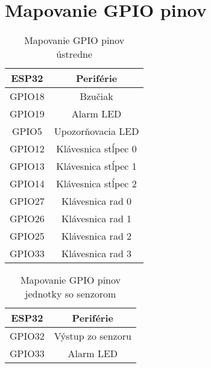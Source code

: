 \chapter{Mapovanie GPIO pinov}

\begin{table}[ht]
    \centering
    \renewcommand{\arraystretch}{1.5}
    \begin{tabular}{|c|c|}
        \hline
        \textbf{ESP32} & \textbf{Periférie} \\ \hline
        GPIO18 &	Bzučiak \\ \hline
        GPIO19 &	Alarm LED \\ \hline
        GPIO5  &	Upozorňovacia LED \\ \hline
        GPIO12 &	Klávesnica stĺpec 0 \\ \hline
        GPIO13 &	Klávesnica stĺpec 1 \\ \hline
        GPIO14 &	Klávesnica stĺpec 2 \\ \hline
        GPIO27 &	Klávesnica rad 0 \\ \hline
        GPIO26 &	Klávesnica rad 1 \\ \hline
        GPIO25 &	Klávesnica rad 2 \\ \hline
        GPIO33 &	Klávesnica rad 3 \\ \hline
    \end{tabular}
    \caption{Mapovanie GPIO pinov ústredne}
    \label{tab:gpio_ustredna}
\end{table}

\begin{table}[ht]
    \centering
    \renewcommand{\arraystretch}{1.5}
    \begin{tabular}{|c|c|}
        \hline
        \textbf{ESP32} & \textbf{Periférie} \\ \hline
        GPIO32 &	Výstup zo senzoru \\ \hline
        GPIO33 &	Alarm LED \\ \hline
    \end{tabular}
    \caption{Mapovanie GPIO pinov jednotky so senzorom}
    \label{tab:gpio_senzor}
\end{table}